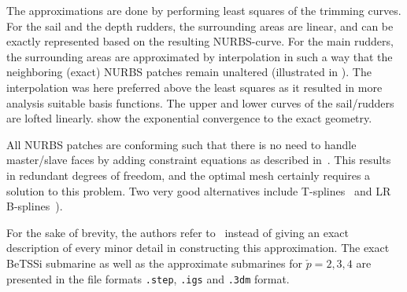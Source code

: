 The approximations are done by performing least squares of the trimming curves. For the sail and the depth rudders, the surrounding areas are linear, and can be exactly represented based on the resulting NURBS-curve. For the main rudders, the surrounding areas are approximated by interpolation in such a way that the neighboring (exact) NURBS patches remain unaltered (illustrated in ). The interpolation was here preferred above the least squares as it resulted in more analysis suitable basis functions. The upper and lower curves of the sail/rudders are lofted linearly.  show the exponential convergence to the exact geometry.

All NURBS patches are conforming such that there is no need to handle master/slave faces by adding constraint equations as described in~\cite[p. 87-91]{Cottrell2006iao}. This results in redundant degrees of freedom, and the optimal mesh certainly requires a solution to this problem. Two very good alternatives include T-splines~\cite{Scott2011tsa} and LR B-splines~\cite{Johannessen2014iau}).

For the sake of brevity, the authors refer to~\cite{Venas2019bts} instead of giving an exact description of every minor detail in constructing this approximation. The exact BeTSSi submarine as well as the approximate submarines for $\check{p}=2,3,4$ are presented in the file formats \texttt{.step}, \texttt{.igs} and \texttt{.3dm} format. 

